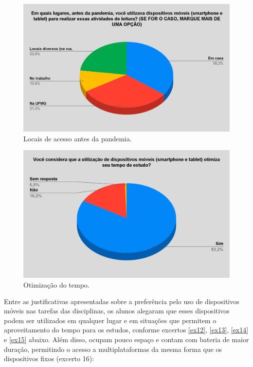 \documentclass[portuguese]{textolivre}
\begin{document}
\begin{figure}[h!]
\centering
\begin{minipage}{.65\textwidth}
 \includegraphics[width=\textwidth]{fig3.jpg}
 \caption{Locais de acesso antes da pandemia.}
 \label{fig03}
\end{minipage}
\end{figure}

\begin{figure}[h!]
\centering
\begin{minipage}{.65\textwidth}
 \includegraphics[width=\textwidth]{fig04.jpg}
 \caption{Otimização do tempo.}
 \label{fig04}
\end{minipage}
\end{figure}

Entre as justificativas apresentadas sobre a preferência pelo uso de dispositivos móveis nas tarefas das disciplinas, os alunos alegaram que esses dispositivos podem ser utilizados em qualquer lugar e em situações que permitem o aproveitamento do tempo para os estudos, conforme excertos \ref{ex12}, \ref{ex13}, \ref{ex14} e \ref{ex15} abaixo. Além disso,  ocupam pouco espaço e contam com bateria de maior duração, permitindo o acesso a multiplataformas da mesma forma que os dispositivos fixos (excerto 16):
\end{document}
